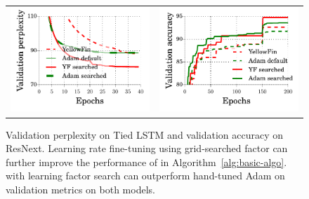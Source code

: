  	
\begin{figure}
\centering
\begin{tabular}{c c} 
 	\includegraphics[width=0.4\linewidth]{experiment_results/pytorch_tied_ptb_test_perp_boost_all_seed.pdf} &
 	\includegraphics[width=0.4\linewidth]{experiment_results/pytorch_cifar_test_acc_boost.pdf}
\end{tabular}
\caption{Validation perplexity on Tied LSTM and validation accuracy on ResNext. Learning rate fine-tuning using grid-searched factor can further improve the performance of \tuner in Algorithm~\ref{alg:basic-algo}. \tuner with learning factor search can outperform hand-tuned Adam  on validation metrics on both models.}
\label{fig:yf_boost}
\end{figure}





